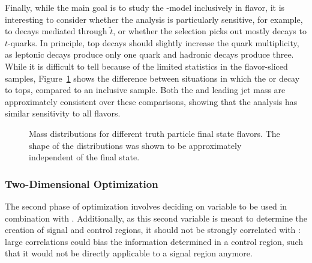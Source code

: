 
Finally, while the main goal is to study the \gluino-\lsp model inclusively in flavor, it is interesting to consider whether the analysis is particularly sensitive, for example, to \gluino decays mediated through $\tilde{t}$, or whether the selection picks out mostly \lsp decays to $t$-quarks. In principle, top decays should slightly increase the quark multiplicity, as leptonic decays produce only one quark and hadronic decays produce three. While it is difficult to tell because of the limited statistics in the flavor-sliced samples, Figure~\ref{fig:search:search:optimization:flavor} shows the difference between situations in which the \gluino or \lsp decay to tops, compared to an inclusive sample. Both the \MJ and leading jet mass are approximately consistent over these comparisons, showing that the analysis has similar sensitivity to all flavors.


\begin{figure}[!ht]
  \centering

  
    \caption{Mass distributions for different truth particle final state flavors. The shape of the distributions was shown to be approximately independent of the final state.}
  \label{fig:search:search:optimization:flavor}
\end{figure}

\subsubsection{Two-Dimensional Optimization}

The second phase of optimization involves deciding on variable to be used in combination with \MJ. Additionally, as this second variable is meant to determine the creation of signal and control regions, it should not be strongly correlated with \MJ: large correlations could bias the information determined in a control region, such that it would not be directly applicable to a signal region anymore.

